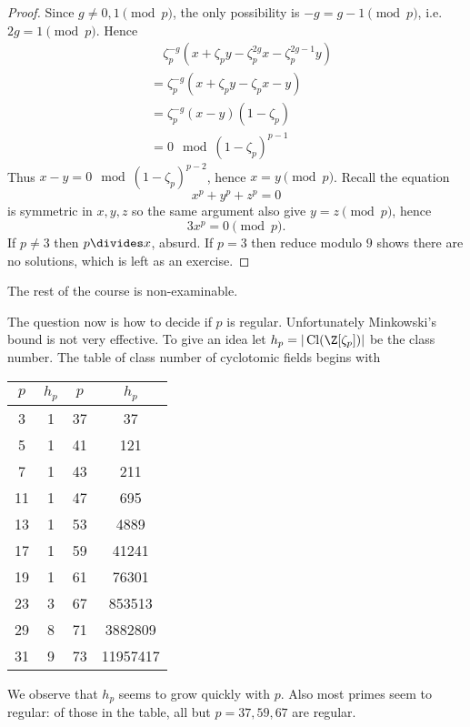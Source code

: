 \documentclass[a4paper]{article}
\DeclareMathOperator{\Cl}{Cl}%
\begin{document}
\begin{proof}
  Since \(g \neq 0, 1 \pmod p\), the only possibility is \(-g = g - 1 \pmod p\), i.e.\  \(2g = 1 \pmod p\). Hence
  \begin{align*}
    & \quad \zeta_p^{-g}(x + \zeta_p y - \zeta_p^{2g} x - \zeta_p^{2g - 1} y) \\
    &= \zeta_p^{-g} (x + \zeta_p y - \zeta_p x - y) \\
    &= \zeta_p^{-g} (x - y) (1 - \zeta_p) \\
    &= 0 \mod{(1 - \zeta_p)^{p - 1}}
  \end{align*}
  Thus \(x - y = 0 \mod{(1 - \zeta_p)^{p - 2}}\), hence \(x = y \pmod p\). Recall the equation
  \[
    x^p + y^p + z^p = 0
  \]
  is symmetric in \(x, y, z\) so the same argument also give \(y = z \pmod p\), hence
  \[
    3x^p = 0 \pmod p.
  \]
  If \(p \neq 3\) then \(p \divides x\), absurd. If \(p = 3\) then reduce modulo \(9\) shows there are no solutions, which is left as an exercise.
\end{proof}

The rest of the course is non-examinable.

The question now is how to decide if \(p\) is regular. Unfortunately Minkowski's bound is not very effective. To give an idea let \(h_p = |\Cl(\Z[\zeta_p])|\) be the class number. The table of class number of cyclotomic fields begins with
\begin{table}[ht]
  \centering
  \begin{tabular}{|c|c||c|c|}
    \(p\) & \(h_p\) & \(p\) & \(h_p\) \\ \hline
    3 & 1 & 37 & 37 \\ \hline
    5 & 1 & 41 & 121 \\ \hline
    7 & 1 & 43 & 211 \\ \hline
    11 & 1 & 47 & 695 \\ \hline
    13 & 1 & 53 & 4889 \\ \hline
    17 & 1 & 59 & 41241 \\ \hline
    19 & 1 & 61 & 76301 \\ \hline
    23 & 3 & 67 & 853513 \\ \hline
    29 & 8 & 71 & 3882809 \\ \hline
    31 & 9 & 73 & 11957417 \\
  \end{tabular}
\end{table}

We observe that \(h_p\) seems to grow quickly with \(p\). Also most primes seem to regular: of those in the table, all but \(p = 37, 59, 67\) are regular.
\end{document}

